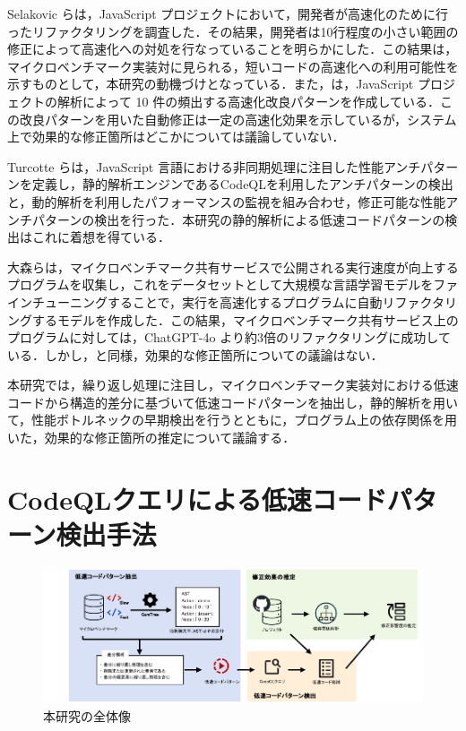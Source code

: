 \documentclass[submit,techrep,noauthor]{ipsj}
\begin{document}
Selakovic ら\cite{jsRefac}は，JavaScript プロジェクトにおいて，開発者が高速化のために行ったリファクタリングを調査した．その結果，開発者は10行程度の小さい範囲の修正によって高速化への対処を行なっていることを明らかにした．この結果は，マイクロベンチマーク実装対に見られる，短いコードの高速化への利用可能性を示すものとして，本研究の動機づけとなっている．また，\cite{jsRefac}は，JavaScript プロジェクトの解析によって 10 件の頻出する高速化改良パターンを作成している．この改良パターンを用いた自動修正は一定の高速化効果を示しているが，システム上で効果的な修正箇所はどこかについては議論していない．

Turcotte ら\cite{DrAsync}は，JavaScript 言語における非同期処理に注目した性能アンチパターンを定義し，静的解析エンジンであるCodeQL\cite{ql}を利用したアンチパターンの検出と，動的解析を利用したパフォーマンスの監視を組み合わせ，修正可能な性能アンチパターンの検出を行った．本研究の静的解析による低速コードパターンの検出はこれに着想を得ている．

大森ら\cite{omori}は，マイクロベンチマーク共有サービスで公開される実行速度が向上するプログラムを収集し，これをデータセットとして大規模な言語学習モデルをファインチューニングすることで，実行を高速化するプログラムに自動リファクタリングするモデルを作成した．この結果，マイクロベンチマーク共有サービス上のプログラムに対しては，ChatGPT-4o より約3倍のリファクタリングに成功している．しかし，\cite{jsRefac}と同様，効果的な修正箇所についての議論はない．
 
本研究では，繰り返し処理に注目し，マイクロベンチマーク実装対における低速コードから構造的差分に基づいて低速コードパターンを抽出し，静的解析を用いて，性能ボトルネックの早期検出を行うとともに，プログラム上の依存関係を用いた，効果的な修正箇所の推定について議論する．


\section{CodeQLクエリによる低速コードパターン検出手法}
\label{sec3:format}

\begin{figure}[t]
    \centering
    \includegraphics[width=1.0\linewidth]{./Noguchi_fig/approach_abst.pdf}
    \caption{本研究の全体像}
    \label{fig:Approach}
\end{figure}
\end{document}

